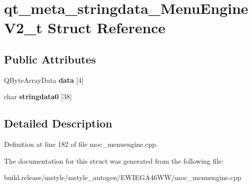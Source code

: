 \hypertarget{structqt__meta__stringdata___menu_engine_v2__t}{}\section{qt\+\_\+meta\+\_\+stringdata\+\_\+\+Menu\+Engine\+V2\+\_\+t Struct Reference}
\label{structqt__meta__stringdata___menu_engine_v2__t}
\subsection*{Public Attributes}
\begin{DoxyCompactItemize}
\item 
\mbox{\label{structqt__meta__stringdata___menu_engine_v2__t_a5a077dbf1fd1696f87679159c2d41ea6}} 
Q\+Byte\+Array\+Data {\bfseries data} \mbox{[}4\mbox{]}
\item 
\mbox{\label{structqt__meta__stringdata___menu_engine_v2__t_aaa2a08bc2c11d84bff75b20a6da5fc22}} 
char {\bfseries stringdata0} \mbox{[}38\mbox{]}
\end{DoxyCompactItemize}


\subsection{Detailed Description}


Definition at line 182 of file moc\+\_\+menuengine.\+cpp.



The documentation for this struct was generated from the following file\+:\begin{DoxyCompactItemize}
\item 
build.\+release/mstyle/mstyle\+\_\+autogen/\+E\+W\+I\+E\+G\+A46\+W\+W/moc\+\_\+menuengine.\+cpp\end{DoxyCompactItemize}
